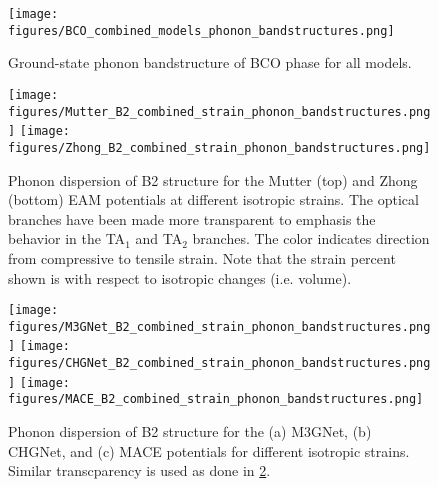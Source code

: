 \documentclass[preprint]{elsarticle}
\begin{document}
\begin{figure}[ht!]
    \begin{centering}
        \texttt{[image: figures/BCO\_combined\_models\_phonon\_bandstructures.png]}
        \caption{
          Ground-state phonon bandstructure of BCO phase for all models.
        }
        \label{fig:allmodels_no_strainphonon_B19P}
    \end{centering}
\end{figure}

\begin{figure}[ht!]
    \begin{centering}
        \texttt{[image: figures/Mutter\_B2\_combined\_strain\_phonon\_bandstructures.png]}
        \vspace{1mm}
        \texttt{[image: figures/Zhong\_B2\_combined\_strain\_phonon\_bandstructures.png]}
        \caption{
           Phonon dispersion of B2 structure for the Mutter (top) and Zhong (bottom)  EAM potentials at different isotropic strains. The optical branches have been made more transparent to emphasis the behavior in the TA$_1$ and TA$_2$ branches. The color indicates direction from compressive to tensile strain. Note that the strain percent shown is with respect to isotropic changes (i.e. volume). 
        }
        \label{fig:mutter_zhong_phonon_b2}
    \end{centering}
\end{figure}



\begin{figure}[ht!]
    \begin{centering}
      \texttt{[image: figures/M3GNet\_B2\_combined\_strain\_phonon\_bandstructures.png]}
      \vspace{1mm}
      \texttt{[image: figures/CHGNet\_B2\_combined\_strain\_phonon\_bandstructures.png]}
      \vspace{1mm}
      \texttt{[image: figures/MACE\_B2\_combined\_strain\_phonon\_bandstructures.png]}
      \caption{
        Phonon dispersion of B2 structure for the (a) M3GNet, (b) CHGNet, and (c) MACE potentials for different isotropic strains. Similar transcparency is used as done in \ref{fig:mutter_zhong_phonon_b2}.
      }
      \label{fig:gnn_phonon_b2}
    \end{centering}
\end{figure}
\end{document}
